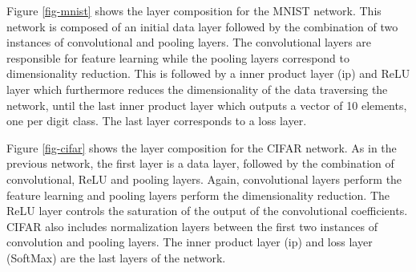 Figure \ref{fig-mnist} shows the layer composition for the MNIST network. 
This network is composed of an initial data layer followed by the 
combination of two instances of convolutional and pooling layers. The 
convolutional layers are responsible for feature learning while the 
pooling layers correspond to dimensionality reduction. 
This is followed by a inner product layer (ip) and ReLU layer which furthermore reduces the dimensionality 
of the data traversing the network, until the last inner product layer which 
outputs a vector of 10 elements, one per digit class. The last layer corresponds to a loss layer.

Figure \ref{fig-cifar} shows the layer composition for the CIFAR network. 
As in the previous network, the first layer is a data layer, followed by 
the combination of convolutional, ReLU and pooling layers. Again, convolutional 
layers perform the feature learning and pooling layers perform the 
dimensionality reduction. The ReLU layer controls the saturation of 
the output of the convolutional coefficients. CIFAR also includes 
normalization layers between the first two instances of convolution and pooling 
layers.  The inner product layer (ip) and loss layer (SoftMax) are the last layers of the network. 

